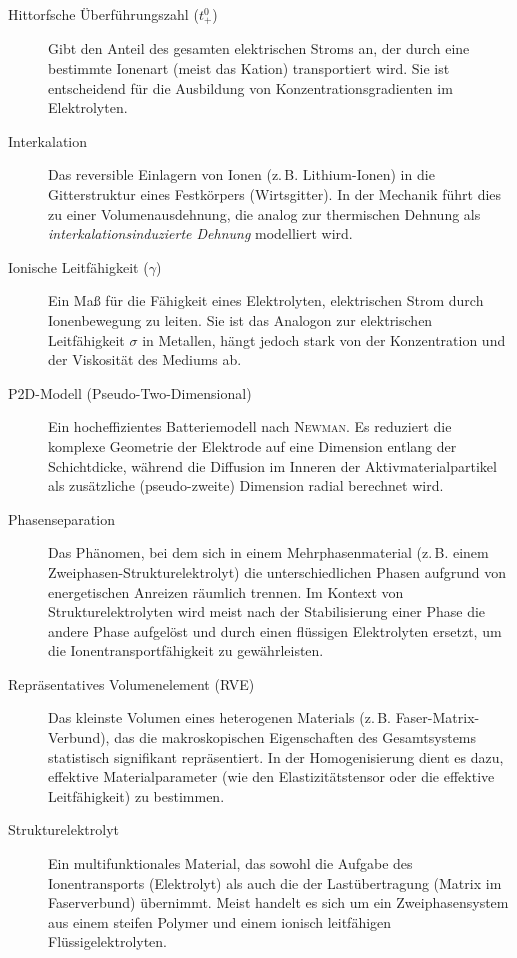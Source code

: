 \begin{description}
    \item[Hittorfsche Überführungszahl ($t_+^0$)] Gibt den Anteil des gesamten elektrischen Stroms an, der durch eine bestimmte Ionenart (meist das Kation) transportiert wird. Sie ist entscheidend für die Ausbildung von Konzentrationsgradienten im Elektrolyten.
    
    \item[Interkalation] Das reversible Einlagern von Ionen (z.\,B. Lithium-Ionen) in die Gitterstruktur eines Festkörpers (Wirtsgitter). In der Mechanik führt dies zu einer Volumenausdehnung, die analog zur thermischen Dehnung als \textit{interkalationsinduzierte Dehnung} modelliert wird.
    
    \item[Ionische Leitfähigkeit ($\gamma$)] Ein Maß für die Fähigkeit eines Elektrolyten, elektrischen Strom durch Ionenbewegung zu leiten. Sie ist das Analogon zur elektrischen Leitfähigkeit $\sigma$ in Metallen, hängt jedoch stark von der Konzentration und der Viskosität des Mediums ab.
    
    \item[P2D-Modell (Pseudo-Two-Dimensional)] Ein hocheffizientes Batteriemodell nach \textsc{Newman}. Es reduziert die komplexe Geometrie der Elektrode auf eine Dimension entlang der Schichtdicke, während die Diffusion im Inneren der Aktivmaterialpartikel als zusätzliche (pseudo-zweite) Dimension radial berechnet wird.
    
    \item[Phasenseparation] Das Phänomen, bei dem sich in einem Mehrphasenmaterial (z.\,B. einem Zweiphasen-Strukturelektrolyt) die unterschiedlichen Phasen aufgrund von energetischen Anreizen räumlich trennen. Im Kontext von Strukturelektrolyten wird meist nach der Stabilisierung einer Phase die andere Phase aufgelöst und durch einen flüssigen Elektrolyten ersetzt, um die Ionentransportfähigkeit zu gewährleisten.
    
    \item[Repräsentatives Volumenelement (RVE)] Das kleinste Volumen eines heterogenen Materials (z.\,B. Faser-Matrix-Verbund), das die makroskopischen Eigenschaften des Gesamtsystems statistisch signifikant repräsentiert. In der Homogenisierung dient es dazu, effektive Materialparameter (wie den Elastizitätstensor oder die effektive Leitfähigkeit) zu bestimmen.

    \item[Strukturelektrolyt] Ein multifunktionales Material, das sowohl die Aufgabe des Ionentransports (Elektrolyt) als auch die der Lastübertragung (Matrix im Faserverbund) übernimmt. Meist handelt es sich um ein Zweiphasensystem aus einem steifen Polymer und einem ionisch leitfähigen Flüssigelektrolyten.
    

\end{description}
